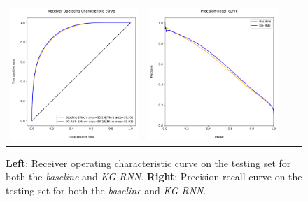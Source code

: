 \begin{figure}[H]
 \begin{tabularx}{\textwidth}{XXXX}
  \includegraphics{figures/roc-curves.pdf} &
  \includegraphics{figures/pr-curves.pdf}
 \end{tabularx}
 \caption{\textbf{Left}: Receiver operating characteristic curve on the testing set for both the \emph{baseline} and \emph{KG-RNN}. \textbf{Right}: Precision-recall curve on the testing set for both the \emph{baseline} and \emph{KG-RNN}.}
\end{figure}
